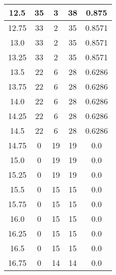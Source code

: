 \documentclass[letterpaper, 12pt]{article}
\begin{document}
\begin{longtable}{|c|c|c|c|c|}
12.5 & 35 & 3 & 38 & 0.875 \\
\hline
12.75 & 33 & 2 & 35 & 0.8571 \\
\hline
13.0 & 33 & 2 & 35 & 0.8571 \\
\hline
13.25 & 33 & 2 & 35 & 0.8571 \\
\hline
13.5 & 22 & 6 & 28 & 0.6286 \\
\hline
13.75 & 22 & 6 & 28 & 0.6286 \\
\hline
14.0 & 22 & 6 & 28 & 0.6286 \\
\hline
14.25 & 22 & 6 & 28 & 0.6286 \\
\hline
14.5 & 22 & 6 & 28 & 0.6286 \\
\hline
14.75 & 0 & 19 & 19 & 0.0 \\
\hline
15.0 & 0 & 19 & 19 & 0.0 \\
\hline
15.25 & 0 & 19 & 19 & 0.0 \\
\hline
15.5 & 0 & 15 & 15 & 0.0 \\
\hline
15.75 & 0 & 15 & 15 & 0.0 \\
\hline
16.0 & 0 & 15 & 15 & 0.0 \\
\hline
16.25 & 0 & 15 & 15 & 0.0 \\
\hline
16.5 & 0 & 15 & 15 & 0.0 \\
\hline
16.75 & 0 & 14 & 14 & 0.0 \\
\hline
\end{longtable}
\end{document}
